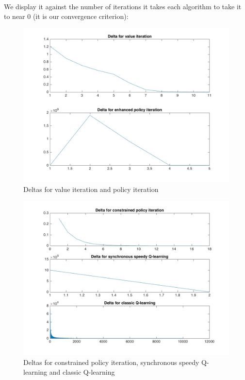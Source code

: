 \documentclass[a4paper, 12pt]{report}
\begin{document}
We display it against the number of iterations it takes each algorithm to take it to near 0 (it is our convergence criterion):

\begin{figure}[H]
\begin{center}
\includegraphics[width=13cm]{deltas.jpg}
\caption{Deltas for value iteration and policy iteration}
\end{center}
\end{figure}

\begin{figure}[H]
\begin{center}
\includegraphics[width=13cm]{deltas_the_sequel.jpg}
\caption{Deltas for constrained policy iteration, synchronous speedy Q-learning and classic Q-learning}
\end{center}
\end{figure}
\end{document}
